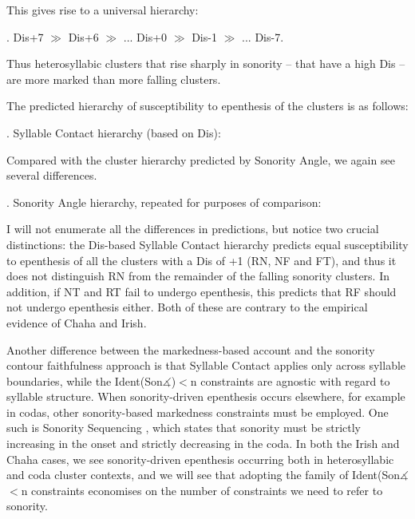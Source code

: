 \documentclass[12pt]{article}
\begin{document}
This gives rise to a universal hierarchy:

\ex. {\sc *Dis+7} $\gg$ {\sc *Dis+6} $\gg$ ... {\sc *Dis+0} $\gg$ {\sc *Dis-1} $\gg$ ... {\sc *Dis-7}.

Thus heterosyllabic clusters that rise sharply in sonority -- that have a high {\sc Dis} -- are more marked than more falling clusters.

The predicted hierarchy of susceptibility to epenthesis of the clusters is as follows:

\ex. Syllable Contact hierarchy (based on {\sc *Dis}):

\vspace{-3em}
\noindent \resizebox{\linewidth}{!}{\usebox{\syllablecontacthierarchy}}

\bigskip

Compared with the cluster hierarchy predicted by {\sc Sonority Angle}, we again see several differences.

\ex. {\sc Sonority Angle} hierarchy, repeated for purposes of comparison:

\noindent \resizebox{\linewidth}{!}{\usebox{\sonorityanglehierarchycompressed}}

I will not enumerate all the differences in predictions, but notice two crucial distinctions: the {\sc Dis}-based Syllable Contact hierarchy predicts equal susceptibility to epenthesis of all the clusters with a {\sc Dis} of +1 (RN, NF and FT), and thus it does not distinguish RN from the remainder of the falling sonority clusters. In addition, if NT and RT fail to undergo epenthesis, this predicts that RF should not undergo epenthesis either. Both of these are contrary to the empirical evidence of Chaha and Irish.

\bigskip

Another difference between the markedness-based account and the sonority contour faithfulness approach is that Syllable Contact applies only across syllable boundaries, while the {\sc Ident(Son$\measuredangle$)}$<$n constraints are agnostic with regard to syllable structure. When sonority-driven epenthesis occurs elsewhere, for example in codas, other sonority-based markedness constraints must be employed.  One such is Sonority Sequencing \citep{selkirk.1984}, which states that sonority must be strictly increasing in the onset and strictly decreasing in the coda. In both the Irish and Chaha cases, we see sonority-driven epenthesis occurring both in heterosyllabic and coda cluster contexts, and we will see that adopting the family of {\sc Ident(Son$\measuredangle$}$<$n constraints economises on the number of constraints we need to refer to sonority.
\end{document}
